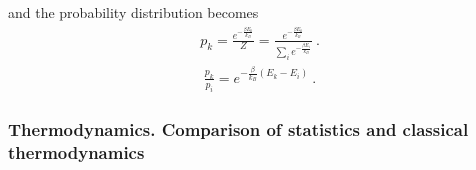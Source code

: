 \documentclass[letterpaper,10pt,english]{jupyterBook}
\begin{document}
\sphinxAtStartPar
and the probability distribution becomes
\begin{equation*}
\begin{split}p_k = \frac{e^{-\frac{\beta E_k}{k_B}}}{Z} =  \frac{e^{-\frac{\beta E_k}{k_B}}}{ \sum_{i} e^{-\frac{\beta E_i}{k_B}}} \ .\end{split}
\end{equation*}
\sphinxAtStartPar
{}
\begin{equation*}
\begin{split}\frac{p_k}{p_i} = e^{-\frac{\beta}{k_B}(E_k - E_i)} \ .\end{split}
\end{equation*}\subsubsection*{Thermodynamics. Comparison of statistics and classical thermodynamics}
\end{document}
